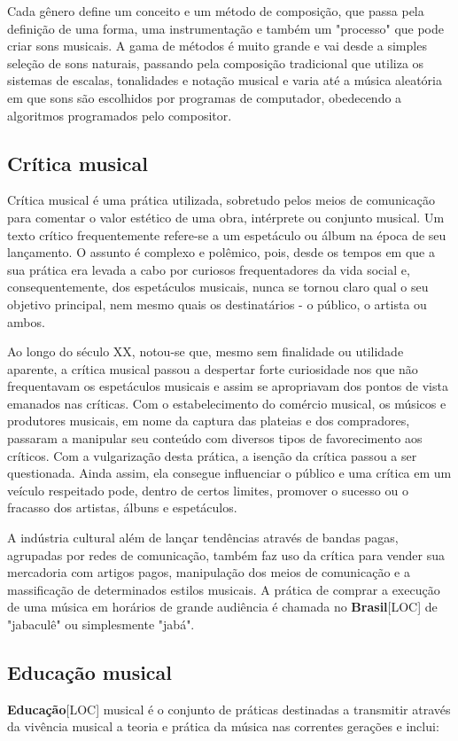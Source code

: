 \documentclass[a4paper,12pt]{article}
\begin{document}
Cada gênero define um conceito e um método de composição, que passa pela definição de uma forma, uma instrumentação e também um "processo" que pode criar sons musicais. A gama de métodos é muito grande e vai desde a simples seleção de sons naturais, passando pela composição tradicional que utiliza os sistemas de escalas, tonalidades e notação musical e varia até a música aleatória em que sons são escolhidos por programas de computador, obedecendo a algoritmos programados pelo compositor.

\subsection*{Crítica musical}
Crítica musical é uma prática utilizada, sobretudo pelos meios de comunicação para comentar o valor estético de uma obra, intérprete ou conjunto musical. Um texto crítico frequentemente refere-se a um espetáculo ou álbum na época de seu lançamento. O assunto é complexo e polêmico, pois, desde os tempos em que a sua prática era levada a cabo por curiosos frequentadores da vida social e, consequentemente, dos espetáculos musicais, nunca se tornou claro qual o seu objetivo principal, nem mesmo quais os destinatários - o público, o artista ou ambos.

Ao longo do século XX, notou-se que, mesmo sem finalidade ou utilidade aparente, a crítica musical passou a despertar forte curiosidade nos que não frequentavam os espetáculos musicais e assim se apropriavam dos pontos de vista emanados nas críticas. Com o estabelecimento do comércio musical, os músicos e produtores musicais, em nome da captura das plateias e dos compradores, passaram a manipular seu conteúdo com diversos tipos de favorecimento aos críticos. Com a vulgarização desta prática, a isenção da crítica passou a ser questionada. Ainda assim, ela consegue influenciar o público e uma crítica em um veículo respeitado pode, dentro de certos limites, promover o sucesso ou o fracasso dos artistas, álbuns e espetáculos.

A indústria cultural além de lançar tendências através de bandas pagas, agrupadas por redes de comunicação, também faz uso da crítica para vender sua mercadoria com artigos pagos, manipulação dos meios de comunicação e a massificação de determinados estilos musicais. A prática de comprar a execução de uma música em horários de grande audiência é chamada no \textbf{Brasil}\textsc{[LOC]} de "jabaculê" ou simplesmente "jabá".

\subsection*{Educação musical}
\textbf{Educação}\textsc{[LOC]} musical é o conjunto de práticas destinadas a transmitir através da vivência musical a teoria e prática da música nas correntes gerações e inclui:
\end{document}
